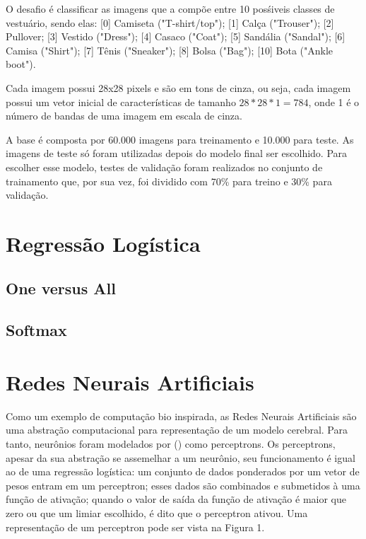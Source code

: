 \documentclass[conference]{IEEEtran}
\begin{document}
	O desafio é classificar as imagens que a compõe entre 10 posśiveis classes de vestuário, sendo elas: [0] Camiseta ("T-shirt/top"); [1] Calça ("Trouser"); [2] Pullover; [3] Vestido ("Dress"); [4] Casaco ("Coat"); [5] Sandália ("Sandal"); [6] Camisa ("Shirt"); [7] Tênis ("Sneaker"); [8] Bolsa ("Bag"); [10] Bota ("Ankle boot").
	
	Cada imagem possui 28x28 pixels e são em tons de cinza, ou seja, cada imagem possui um vetor inicial de características de tamanho $28*28*1 = 784$, onde 1 é o número de bandas de uma imagem em escala de cinza.
	
	A base é composta por 60.000 imagens para treinamento e 10.000 para teste. As imagens de teste só foram utilizadas depois do modelo final ser escolhido. Para escolher esse modelo, testes de validação foram realizados no conjunto de trainamento que, por sua vez, foi dividido com 70\% para treino e 30\% para validação.
	
\section{Regressão Logística}

\subsection{One versus All}

\subsection{Softmax}

\section{Redes Neurais Artificiais}

	Como um exemplo de computação bio inspirada, as Redes Neurais Artificiais são uma abstração computacional para representação de um modelo cerebral. Para tanto, neurônios foram modelados por	\citeauthor{rosenblatt1957perceptron} (\citeyear{rosenblatt1957perceptron}) como perceptrons. Os perceptrons, apesar da sua abstração se assemelhar a um neurônio, seu funcionamento é igual ao de uma regressão logística: um conjunto de dados ponderados por um vetor de pesos entram em um perceptron; esses dados são combinados e submetidos à uma função de ativação; quando o valor de saída da função de ativação é maior que zero ou que um limiar escolhido, é dito que o perceptron ativou. Uma representação de um perceptron pode ser vista na Figura 1.
	
\end{document}
